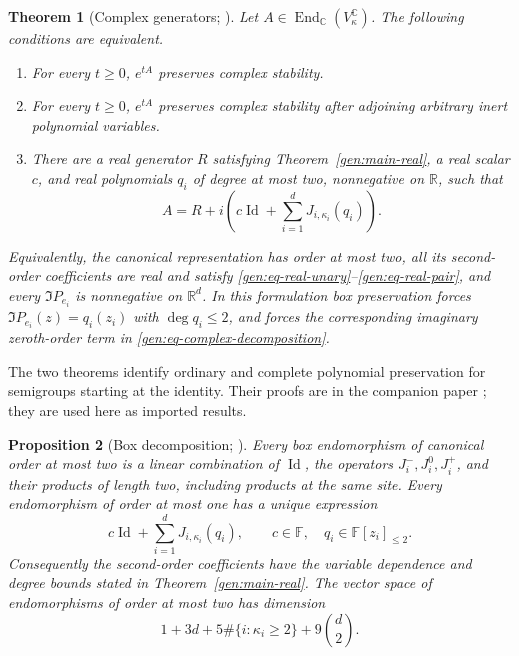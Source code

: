 \documentclass[reqno]{amsart}
\newtheorem{theorem}{Theorem}[section]
\newtheorem{proposition}[theorem]{Proposition}
\theoremstyle{definition}
\theoremstyle{remark}
\newcommand{\C}{\mathbb C}
\newcommand{\R}{\mathbb R}
\DeclareMathOperator{\Id}{Id}
\begin{document}
\begin{theorem}[Complex generators; \cite{WeiGenerators2026}]
\label{gen:main-complex}
Let \(A\in\operatorname{End}_{\C}(V_\kappa^\C)\).  The following conditions
are equivalent.
\begin{enumerate}
\item For every \(t\geq0\), \(e^{tA}\) preserves complex stability.
\item For every \(t\geq0\), \(e^{tA}\) preserves complex stability after
adjoining arbitrary inert polynomial variables.
\item There are a real generator \(R\) satisfying
Theorem~\ref{gen:main-real}, a real scalar \(c\), and real polynomials
\(q_i\) of degree at most two, nonnegative on \(\R\), such that
\begin{equation}
 A=R+i\left(c\Id+\sum_{i=1}^dJ_{i,\kappa_i}(q_i)\right).
 \label{gen:eq-complex-decomposition}
\end{equation}
\end{enumerate}
Equivalently, the canonical representation has order at most two, all its
second-order coefficients are real and satisfy
\eqref{gen:eq-real-unary}--\eqref{gen:eq-real-pair}, and every
\(\Im P_{e_i}\) is nonnegative on \(\R^d\).  In this formulation box
preservation forces
\(\Im P_{e_i}(z)=q_i(z_i)\) with \(\deg q_i\leq2\), and forces the
corresponding imaginary zeroth-order term in
\eqref{gen:eq-complex-decomposition}.
\end{theorem}

The two theorems identify ordinary and complete polynomial preservation
for semigroups starting at the identity. Their proofs are in the companion
paper \cite{WeiGenerators2026}; they are used here as imported results.

\begin{proposition}[Box decomposition; \cite{WeiGenerators2026}]
\label{gen:box-decomposition}
Every box endomorphism of canonical order at most two is a linear
combination of \(\Id\), the operators \(J_i^-,J_i^0,J_i^+\), and their
products of length two, including products at the same site.
Every endomorphism of order at most one has a unique expression
\begin{equation}
 c\Id+\sum_{i=1}^dJ_{i,\kappa_i}(q_i),
 \qquad c\in\mathbb F,\quad q_i\in\mathbb F[z_i]_{\leq2}.
 \label{gen:eq-first-order}
\end{equation}
Consequently the second-order coefficients have the variable dependence
and degree bounds stated in Theorem~\ref{gen:main-real}.  The vector space
of endomorphisms of order at most two has dimension
\begin{equation}
 1+3d+5\#\{i:\kappa_i\geq2\}+9\binom d2.
 \label{gen:eq-order-two-dimension}
\end{equation}
\end{proposition}
\end{document}

